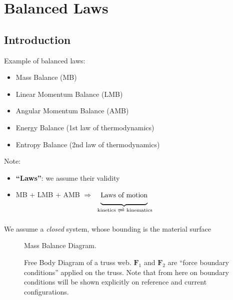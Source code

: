 \chapter{Balanced Laws}

\section{Introduction}

Example of balanced laws:
%
\begin{itemize}
  \item Mass Balance (MB)
  \item Linear Momentum Balance (LMB)
  \item Angular Momentum Balance (AMB)
  \item Energy Balance (1st law of thermodynamics)
  \item Entropy Balance (2nd law of thermodynamics)
\end{itemize}

\vspace{10pt}
Note:
\begin{itemize}
  \item \textbf{``Laws''}: we assume their validity
  \item MB + LMB + AMB \(\Rightarrow\) \(\underbrace{\vphantom{\frac{}{}}\text{Laws of motion}}_{\f{}{}\text{kinetics } \xrightleftharpoons{} \text{ kinematics}}\)
\end{itemize}

We assume a \emph{closed} system, whose bounding is the material surface

\begin{figure}[H]
  \centering
  \caption{Mass Balance Diagram.}
  \label{fig:balance_laws_mass_balance}
\end{figure}



\begin{figure}[H]
  \centering
  \caption{Free Body Diagram of a truss web. \(\bm{F}_1\) and \(\bm{F}_2\) are ``force boundary conditions'' applied on the truss. Note that from here on boundary conditions will be shown explicitly on reference and current configurations.}
  \label{fig:balance_laws_free_body_diag_truss}
\end{figure}


